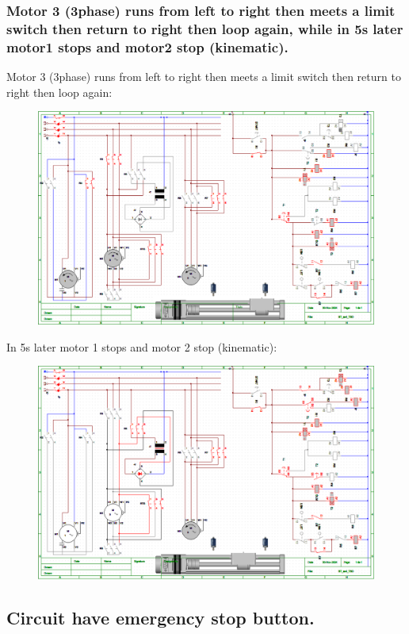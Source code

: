 \subsubsection{Motor 3 (3phase) runs from left to right then meets a limit switch then return to right then loop again,  while in 5s later motor1 stops and motor2 stop (kinematic).}
Motor 3 (3phase) runs from left to right then meets a limit switch then return to right then loop again:
\begin{figure}[H]
    \centering
    \includegraphics[width=1\textwidth]{pictures/1c.png}
\end{figure}
\cleardoublepage
In 5s later motor 1 stops and motor 2 stop (kinematic):
\begin{figure}[H]
    \centering
    \includegraphics[width=1\textwidth]{pictures/1d.png}
\end{figure}
\cleardoublepage
\subsection{Circuit have emergency stop button.}
